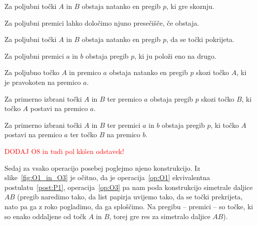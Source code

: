 \begin{operacija}
    \label{op:O1}
    Za poljubni točki $A$ in $B$ obstaja natanko en pregib $p$, ki gre skoznju.
\end{operacija}
\begin{operacija}
    \label{op:02}
    Za poljubni premici lahko določimo njuno presečišče, če obstaja.
\end{operacija}
\begin{operacija}
    \label{op:O3}
    Za poljubni točki $A$ in $B$ obstaja natanko en pregib $p$, da se točki pokrijeta.
\end{operacija}
\begin{operacija}
    \label{op:O4}
    Za poljubni premici $a$ in $b$ obstaja pregib $p$, ki ju položi eno na drugo.
\end{operacija}
\begin{operacija}
    \label{op:O5}
    Za poljubno točko $A$ in premico $a$ obstaja natanko en pregib $p$ skozi točko $A$, ki je pravokoten na premico $a$.
\end{operacija}
\begin{operacija}
    \label{op:O6}
    Za primerno izbrani točki $A$ in $B$ ter premico $a$ obstaja pregib $p$ skozi točko $B$, ki točko $A$ postavi na premico $a$.
\end{operacija}
\begin{operacija}
    \label{op:O7}
    Za primerno izbrani točki $A$ in $B$ ter premici $a$ in $b$ obstaja pregib $p$, ki točko $A$ postavi na premico $a$ ter točko $B$ na premico $b$.
\end{operacija}
\begin{operacija}
    \label{op:08}
    \textcolor{red}{DODAJ O8 in tudi pol kkšen odstavek!}
\end{operacija}

Sedaj za vsako operacijo posebej poglejmo njeno konstrukcijo. Iz slike~\ref{fig:O1_in_O3} je očitno, da je operacija~\ref{op:O1} ekvivalentna postulatu~\ref{post:P1}, operacija~\ref{op:O3} pa nam poda konstrukcijo simetrale daljice $AB$ (pregib naredimo tako, da list papirja uvijemo tako, da se točki prekrijeta, nato pa ga z roko pogladimo, da ga sploščimo. Na pregibu -- premici -- so točke, ki so enako oddaljene od točk $A$ in $B$, torej gre res za simetralo daljice $AB$).

